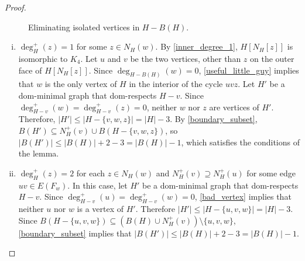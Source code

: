 \documentclass[11pt]{article}
\theoremstyle{definition}
\begin{document}
\begin{proof}
\begin{figure}
    \caption{Eliminating isolated vertices in $H-B(H)$.}
    \label{isolated_fig}
  \end{figure}
  \begin{enumerate}[(i)]
    \item $\deg^+_H(z)=1$ for some $z\in N_H(w)$. By \cref{inner_degree_1}, $H[N_H[z]]$ is isomorphic to $K_4$.  Let $u$ and $v$ be the two vertices, other than $z$ on the outer face of $H[N_H[z]]$.  Since $\deg_{H-B(H)}(w)=0$, \cref{useful_little_guy} implies that $w$ is the only vertex of $H$ in the interior of the cycle $uvz$. Let $H'$ be a dom-minimal graph that dom-respects $H-v$.  Since $\deg^+_{H-v}(w)=\deg^+_{H-v}(z)=0$, neither $w$ nor $z$ are vertices of $H'$. Therefore, $|H'|\le |H-\{v,w,z\}|=|H|-3$.  By \cref{boundary_subset}, $B(H')\subseteq N^+_H(v)\cup B(H-\{v,w,z\})$, so $|B(H')|\le |B(H)|+2-3=|B(H)|-1$, which satisfies the conditions of the lemma.

    \item $\deg^+_H(z)=2$ for each $z\in N_H(w)$ and $N^+_H(v)\supseteq N^+_H(u)$ for some edge $uv\in E(F_w)$.  In this case, let $H'$ be a dom-minimal graph that dom-respects $H-v$. Since $\deg^+_{H-v}(u)=\deg^+_{H-v}(w)=0$, \cref{bad_vertex} implies that neither $u$ nor $w$ is a vertex of $H'$.  Therefore $|H'|\le |H-\{u,v,w\}|=|H|-3$.  Since $B(H-\{u,v,w\})\subseteq (B(H)\cup N^+_{H}(v)) \setminus \{u,v,w\}$, \cref{boundary_subset} implies that $|B(H')|\le |B(H)|+2-3=|B(H)|-1$.


\end{enumerate}
\end{proof}
\end{document}
